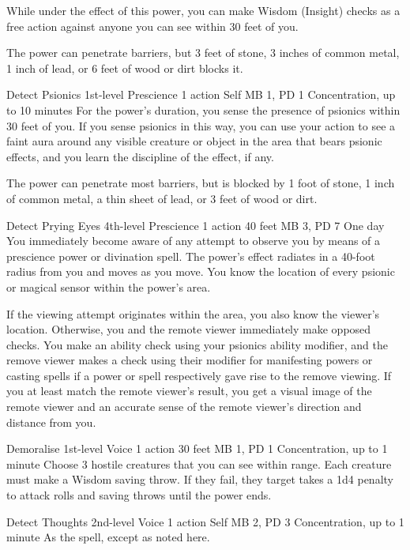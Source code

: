   While under the effect of this power,
  you can make Wisdom (Insight) checks as a free action
  against anyone you can see within 30 feet of you.
  
  The power can penetrate barriers, but 3 feet of stone,
  3 inches of common metal,
  1 inch of lead,
  or 6 feet of wood or dirt blocks it.

\DndPowerHeader%
  {Detect Psionics}
  {1st-level Prescience}
  {1 action}
  {Self}
  {MB 1, PD 1}
  {Concentration, up to 10 minutes}
For the power's duration,
you sense the presence of psionics within 30 feet of you.
If you sense psionics in this way,
you can use your action to see a faint aura around
any visible creature or object in the area that bears psionic effects,
and you learn the discipline of the effect, if any.

The power can penetrate most barriers, but is blocked by
1 foot of stone,
1 inch of common metal,
a thin sheet of lead,
or 3 feet of wood or dirt.

\DndPowerHeader%
  {Detect Prying Eyes}
  {4th-level Prescience}
  {1 action}
  {40 feet}
  {MB 3, PD 7}
  {One day}
  You immediately become aware of any attempt to observe you
  by means of a prescience power or divination spell.
  The power's effect radiates in a 40-foot radius
  from you and moves as you move.
  You know the location of every psionic or magical sensor
  within the power's area.

  If the viewing attempt originates within the area,
  you also know the viewer's location.
  Otherwise, you and the remote viewer immediately make opposed checks.
  You make an ability check using your psionics ability modifier,
  and the remove viewer makes a check using their modifier
  for manifesting powers or casting spells if a power or spell
  respectively gave rise to the remove viewing.
  If you at least match the remote viewer's result,
  you get a visual image of the remote viewer
  and an accurate sense of the remote viewer's
  direction and distance from you.

\DndPowerHeader%
  {Demoralise}
  {1st-level Voice}
  {1 action}
  {30 feet}
  {MB 1, PD 1}
  {Concentration, up to 1 minute}
Choose 3 hostile creatures that you can see within range.
Each creature must make a Wisdom saving throw.
If they fail, they target takes a 1d4 penalty to attack rolls and
saving throws until the power ends.

\DndPowerHeader%
  {Detect Thoughts}
  {2nd-level Voice}
  {1 action}
  {Self}
  {MB 2, PD 3}
  {Concentration, up to 1 minute}
As the  spell, except as noted here.

